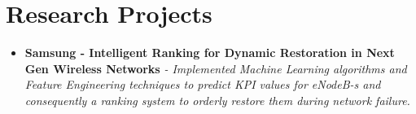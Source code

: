 \documentclass{article}
\begin{document}

\section*{Research Projects}
\begin{itemize}
    \item{\textbf{\large{Samsung - Intelligent Ranking for Dynamic Restoration in
                  Next Gen Wireless Networks}}}
          \newline
          \textit{- Implemented Machine Learning algorithms and Feature Engineering techniques to predict KPI values for eNodeB-s and consequently a ranking system
              to orderly restore them during network failure.}
\end{itemize}
\end{document}
